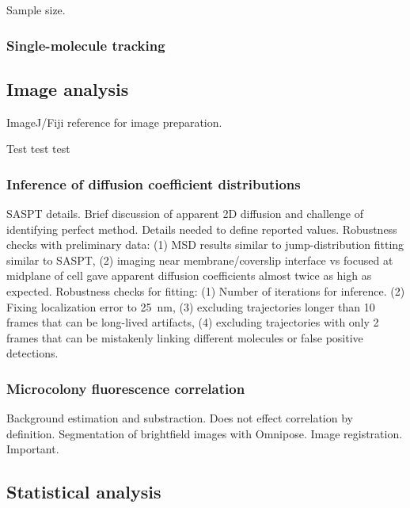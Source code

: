 \documentclass[pdflatex,sn-basic]{sn-jnl}%
\begin{document}
Sample size.

\loremipsum{} 

\subsubsection{Single-molecule tracking}

\loremipsum{} 

\subsection{Image analysis}

ImageJ/Fiji reference for image preparation.

Test test test

\loremipsum{}

\subsubsection{Inference of diffusion coefficient distributions}

SASPT details.
Brief discussion of apparent 2D diffusion and challenge of identifying perfect method.
Details needed to define reported values.
Robustness checks with preliminary data: (1) MSD results similar to jump-distribution fitting similar to SASPT, (2) imaging near membrane/coverslip interface vs focused at midplane of cell gave apparent diffusion coefficients almost twice as high as expected.
Robustness checks for fitting: (1) Number of iterations for inference. (2) Fixing localization error to \qty{25}{nm}, (3) excluding trajectories longer than 10 frames that can be long-lived artifacts, (4) excluding trajectories with only 2 frames that can be mistakenly linking different molecules or false positive detections.

\loremipsum{} 

\subsubsection{Microcolony fluorescence correlation}

Background estimation and substraction. Does not effect correlation by definition.
Segmentation of brightfield images with Omnipose.
Image registration. Important.

\loremipsum{} 

\subsection{Statistical analysis}
\end{document}
